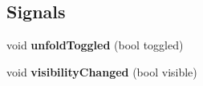 \subsection*{Signals}
\begin{DoxyCompactItemize}
\item 
\hypertarget{class_graph_view_results_a2ea44a53869e882e4c777c6c3c7d5a80}{void {\bfseries unfold\-Toggled} (bool toggled)}\label{class_graph_view_results_a2ea44a53869e882e4c777c6c3c7d5a80}

\item 
\hypertarget{class_graph_view_results_a0465f26d23da3dccfe2649141c00c916}{void {\bfseries visibility\-Changed} (bool visible)}\label{class_graph_view_results_a0465f26d23da3dccfe2649141c00c916}

\end{DoxyCompactItemize}
